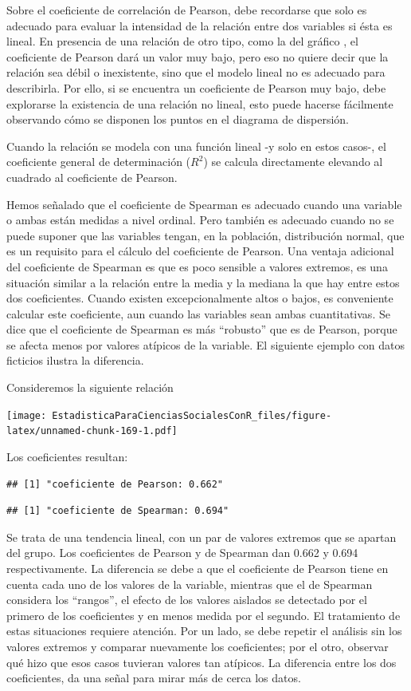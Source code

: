 \documentclass[]{book}
\begin{document}
Sobre el coeficiente de correlación de Pearson, debe recordarse que solo
es adecuado para evaluar la intensidad de la relación entre dos
variables si ésta es lineal. En presencia de una relación de otro tipo,
como la del gráfico , el coeficiente de Pearson dará un valor muy bajo,
pero eso no quiere decir que la relación sea débil o inexistente, sino
que el modelo lineal no es adecuado para describirla. Por ello, si se
encuentra un coeficiente de Pearson muy bajo, debe explorarse la
existencia de una relación no lineal, esto puede hacerse fácilmente
observando cómo se disponen los puntos en el diagrama de dispersión.

Cuando la relación se modela con una función lineal -y solo en estos
casos-, el coeficiente general de determinación (\(R^2\)) se calcula
directamente elevando al cuadrado al coeficiente de Pearson.

Hemos señalado que el coeficiente de Spearman es adecuado cuando una
variable o ambas están medidas a nivel ordinal. Pero también es adecuado
cuando no se puede suponer que las variables tengan, en la población,
distribución normal, que es un requisito para el cálculo del coeficiente
de Pearson. Una ventaja adicional del coeficiente de Spearman es que es
poco sensible a valores extremos, es una situación similar a la relación
entre la media y la mediana la que hay entre estos dos coeficientes.
Cuando existen excepcionalmente altos o bajos, es conveniente calcular este coeficiente, aun cuando las variables sean ambas cuantitativas. Se
dice que el coeficiente de Spearman es más ``robusto'' que es de Pearson,
porque se afecta menos por valores atípicos de la variable. El siguiente ejemplo con datos ficticios ilustra la diferencia.

Consideremos la siguiente relación

\texttt{[image: EstadisticaParaCienciasSocialesConR\_files/figure-latex/unnamed-chunk-169-1.pdf]}

Los coeficientes resultan:

\begin{verbatim}
## [1] "coeficiente de Pearson: 0.662"
\end{verbatim}

\begin{verbatim}
## [1] "coeficiente de Spearman: 0.694"
\end{verbatim}

Se trata de una tendencia lineal, con un par de valores extremos que se apartan del
grupo. Los coeficientes de Pearson y de Spearman dan 0.662 y 0.694 respectivamente. La diferencia se debe a que el coeficiente de Pearson tiene en cuenta cada uno de los valores de la variable, mientras que el de Spearman considera los ``rangos'', el efecto de los valores aislados se detectado por el primero de los coeficientes y en menos medida por el segundo. El
tratamiento de estas situaciones requiere atención. Por un lado, se debe
repetir el análisis sin los valores extremos y comparar nuevamente los
coeficientes; por el otro, observar qué hizo que esos casos tuvieran valores tan atípicos. La diferencia entre los dos coeficientes, da una
señal para mirar más de cerca los datos.
\end{document}
